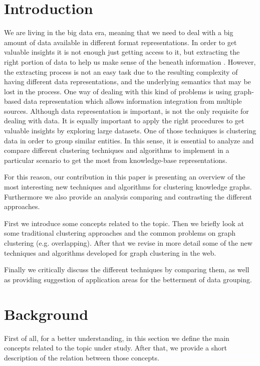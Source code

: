 \documentclass[runningheads]{llncs}
\begin{document}
\section{Introduction} \label{introduction}
We are living in the big data era, meaning that we need to deal with a big amount of data available in different format representations. In order to get valuable insights it is not enough just getting access to it, but extracting the right portion of data to help us make sense of the beneath information \cite{Pedrycz}. However, the extracting process is not an easy task due to the resulting complexity of having different data representations, and the underlying semantics that may be lost in the process. One way of dealing with this kind of problems is using graph-based data representation which allows information integration from multiple sources.
Although data representation is important, is not the only requisite for dealing with data. It is equally important to apply the right procedures to get valuable insights by exploring large datasets. One of those techniques is clustering data in order to group similar entities.  In this sense, it is essential to analyze and compare different clustering techniques and algorithms to implement in a particular scenario to get the most from knowledge-base representations.

For this reason, our contribution in this paper is presenting an overview of the most interesting new techniques and algorithms for clustering knowledge graphs. Furthermore we also provide an analysis comparing and contrasting the different approaches.

First we introduce some concepts related to the topic. Then we briefly look at some traditional clustering approaches and the common problems on graph clustering (e.g. overlapping). After that we revise in more detail some of the new techniques and algorithms developed for graph clustering in the web.

Finally we critically discuss the different techniques by comparing them, as well as providing suggestion of application areas for the betterment of data grouping. 


\section{Background} \label{background}
First of all, for a better understanding, in this section we define the main concepts related to the topic under study. After that, we provide a short description of the relation between those concepts.
\end{document}
